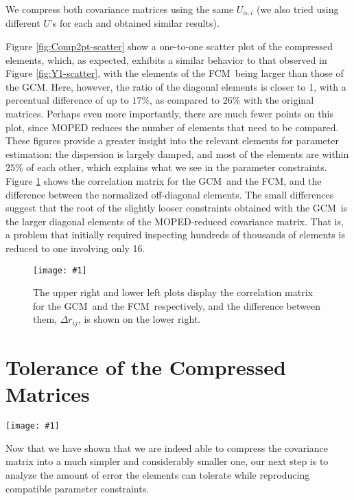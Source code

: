 \documentclass[aps, prd, twocolumn, superscriptaddress, nofootinbib, amssymb, amsmath]{revtex4-2}
\newcommand{\sfig}[2]{
	\texttt{[image: \#1]}
}
\newcommand{\Sfig}[3]{
	\begin{figure}[#1]
		\sfig{../figures/#2.pdf}{\columnwidth}
		\caption{#3}
		\label{fig:#2}
	\end{figure}
}
\newcommand{\Swide}[3]{
	\begin{figure*}[#1]
		\sfig{../figures/#2.pdf}{\textwidth}
		\caption{#3}
		\label{fig:#2}
	\end{figure*}
}
\newcommand{\rf}[1]{Figure \ref{fig:#1}}
\newcommand\full{the FCM}
\newcommand\gaussian{the GCM}
\begin{document}
We compress both covariance matrices using the same $U_{\alpha, i}$ (we also tried using different $U$'s for each and obtained similar results).

\rf{Comp2pt-scatter} show a one-to-one scatter plot of the compressed elements, which, as expected, exhibits a similar behavior to that observed in \rf{Y1-scatter}, with the elements of \full\ being larger than those of \gaussian. Here, however, the ratio of the diagonal elements is closer to 1, with a percentual difference of up to $17\%$, as compared to $26\%$ with the original matrices. Perhaps even more importantly, there are much fewer points on this plot, since MOPED reduces the number of elements that need to be compared. These figures provide a greater insight into the relevant elements for parameter estimation: the dispersion is largely damped, and most of the elements are within $25\%$ of each other, which explains what we see in the parameter constraints. \rf{Comp2pt-correlation} shows the correlation matrix for \gaussian\ and \full, and the difference between the normalized off-diagonal elements. The small differences suggest that the root of the slightly looser constraints obtained with \gaussian\ is the larger diagonal elements of the MOPED-reduced covariance matrix. That is, a problem that initially required inspecting hundreds of thousands of elements is reduced to one involving only 16.

\Sfig{thbp}{Comp2pt-correlation}{The upper right and lower left plots display the correlation matrix for \gaussian\ and \full\ respectively, and the difference between them, $\Delta r_{ij}$, is shown on the lower right.}

\section{Tolerance of the Compressed Matrices}
\label{sec:tolerance}

\Swide{thbp}{Tolerance_constraints}{An error plot showing the changes to the constraints for $\Omega_m$, $S_8$ and $A_{\text{IA}}$ for errors added at $5\%, 10\%, 15\%, 25\%, 30\%, 35\%, 40\%$ and $45\%$ of the original elements (in purple) and eigenvalues (in green) of the compressed covariance matrix. The blue rectangle covers the 68\% CL interval obtained for \full, and the darker blue vertical line shows the mean value for the respective parameter.}

Now that we have shown that we are indeed able to compress the covariance matrix into a much simpler and considerably smaller one, our next step is to analyze the amount of error the elements can tolerate while reproducing compatible parameter constraints.
\end{document}
